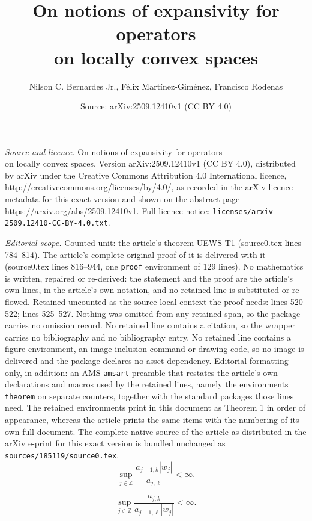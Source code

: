 \documentclass[10pt,a4paper]{amsart}
\title{On notions of expansivity for operators\\ on locally convex spaces}
\author{Nilson C. Bernardes Jr., F\'elix Mart\'inez-Gim\'enez, Francisco Rodenas}
\date{Source: arXiv:2509.12410v1 (CC BY 4.0)}
\newcommand{\Z}{\mathbb{Z}}   %
\begin{document}
\maketitle

\noindent\emph{Source and licence.} On notions of expansivity for operators\\ on locally convex spaces. Version arXiv:2509.12410v1 (CC BY 4.0), distributed by arXiv under the Creative Commons Attribution 4.0 International licence, http://creativecommons.org/licenses/by/4.0/, as recorded in the arXiv licence metadata for this exact version and shown on the abstract page https://arxiv.org/abs/2509.12410v1. Full licence notice: \texttt{licenses/arxiv-2509.12410-CC-BY-4.0.txt}.\par\smallskip

\noindent\textit{Editorial scope.} Counted unit: the article's theorem UEWS-T1 (source0.tex lines 784--814). The article's complete original proof of it is delivered with it (source0.tex lines 816--944, one \texttt{proof} environment of 129 lines). No mathematics is written, repaired or re-derived: the statement and the proof are the article's own lines, in the article's own notation, and no retained line is substituted or re-flowed.  Retained uncounted as the source-local context the proof needs: lines 520--522; lines 525--527.  Nothing was omitted from any retained span, so the package carries no omission record.  No retained line contains a citation, so the wrapper carries no bibliography and no bibliography entry.  No retained line contains a figure environment, an image-inclusion command or drawing code, so no image is delivered and the package declares no asset dependency.  Editorial formatting only, in addition: an AMS \texttt{amsart} preamble that restates the article's own declarations and macros used by the retained lines, namely the environments \texttt{theorem} on separate counters, together with the standard packages those lines need.  The retained environments print in this document as Theorem 1 in order of appearance, whereas the article prints the same items with the numbering of its own full document.  The complete native source of the article as distributed in the arXiv e-print for this exact version is bundled unchanged as \texttt{sources/185119/source0.tex}.
\begin{equation}\label{Fw-Defined}
\sup_{j \in \Z} \frac{a_{j+1,k} |w_j|}{a_{j,\ell}} < \infty.
\end{equation}

\begin{equation}\label{Fw-Invertible}
\sup_{j \in \Z} \frac{a_{j,k}}{a_{j+1,\ell} |w_j|} < \infty.
\end{equation}
\end{document}
